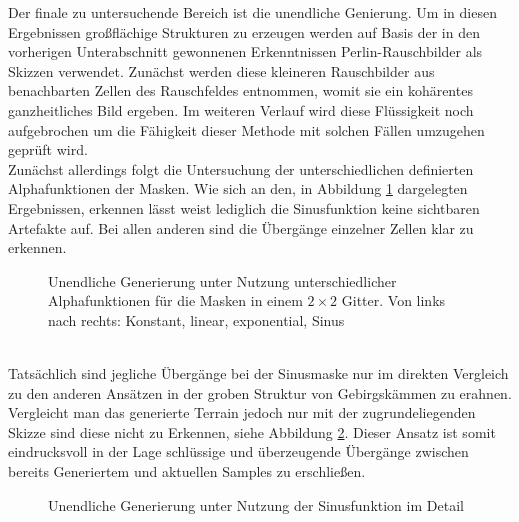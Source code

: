 Der finale zu untersuchende Bereich ist die unendliche Genierung. Um in diesen Ergebnissen großflächige Strukturen zu erzeugen werden auf Basis der in den vorherigen Unterabschnitt gewonnenen Erkenntnissen Perlin-Rauschbilder als Skizzen verwendet. Zunächst werden diese kleineren Rauschbilder aus benachbarten Zellen des Rauschfeldes entnommen, womit sie ein kohärentes ganzheitliches Bild ergeben. Im weiteren Verlauf wird diese Flüssigkeit noch aufgebrochen um die Fähigkeit dieser Methode mit solchen Fällen umzugehen geprüft wird. \\
Zunächst allerdings folgt die Untersuchung der unterschiedlichen definierten Alphafunktionen der Masken. Wie sich an den, in Abbildung \ref{fig:masks} dargelegten Ergebnissen, erkennen lässt weist lediglich die Sinusfunktion keine sichtbaren Artefakte auf. Bei allen anderen sind die Übergänge einzelner Zellen klar zu erkennen. 
\begin{figure}[htbp]
    \centering
    \caption{Unendliche Generierung unter Nutzung unterschiedlicher Alphafunktionen für die Masken in einem $2\times2$ Gitter. Von links nach rechts: Konstant, linear, exponential, Sinus}
    \label{fig:masks}
\end{figure} \\
Tatsächlich sind jegliche Übergänge bei der Sinusmaske nur im direkten Vergleich zu den anderen Ansätzen in der groben Struktur von Gebirgskämmen zu erahnen. Vergleicht man das generierte Terrain jedoch nur mit der zugrundeliegenden Skizze sind diese nicht zu Erkennen, siehe Abbildung \ref{fig:cos_detail}. Dieser Ansatz ist somit eindrucksvoll in der Lage schlüssige und überzeugende Übergänge zwischen bereits Generiertem und aktuellen Samples zu erschließen.
\begin{figure}[htbp]
    \centering
    \caption{Unendliche Generierung unter Nutzung der Sinusfunktion im Detail}
    \label{fig:cos_detail}
\end{figure} \\

